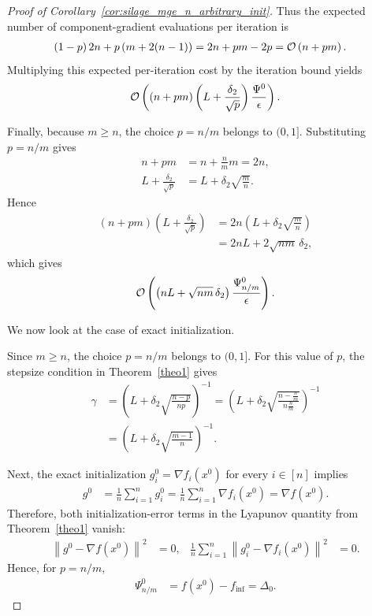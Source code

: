 \documentclass{article}
\newcommand{\sqn}[1]{\left\| #1 \right\|^2}
\newcommand{\nf}[1]{\nabla f\rb{#1}}
\newcommand{\cO}{{\cal O}}
\newcommand{\finf}{f_\mathrm{inf}}
\newcommand{\rb}[1]{\left(#1\right)}
\newcommand {\rbl}[1]{(#1)} %
\renewcommand{\nf}[1]{\nabla f\rbl{#1}}
\newcommand{\nfi}[1]{\nabla f_i\rbl{#1}}
\theoremstyle{plain}
\begin{document}
\begin{proof}[Proof of Corollary~\ref{cor:silage_mge_n_arbitrary_init}]
Thus the expected number of component-gradient evaluations per iteration is
\begin{align*}
(1-p)\,2n+p\rb{m+2(n-1)}
&=
2n+pm-2p
=
\cO\rb{n+pm}.
\end{align*}
Multiplying this expected per-iteration cost by the iteration bound yields
\begin{align*}
\cO\rb{
(n+pm)
\rb{L+\frac{\delta_2}{\sqrt p}}
\frac{\Psi^0}{\epsilon}
}.
\end{align*}

Finally, because $m\ge n$, the choice $p=n/m$ belongs to $(0,1]$. Substituting
$p=n/m$ gives
\begin{align*}
n+pm
&=
n+\frac{n}{m}m
=
2n,
\\
L+\frac{\delta_2}{\sqrt p}
&=
L+\delta_2\sqrt{\frac{m}{n}}.
\end{align*}
Hence
\begin{align*}
(n+pm)\rb{L+\frac{\delta_2}{\sqrt p}}
&=
2n\rb{L+\delta_2\sqrt{\frac{m}{n}}}
\\
&=
2nL+2\sqrt{nm}\,\delta_2,
\end{align*}
which gives
\begin{align*}
\cO\rb{
\rb{nL+\sqrt{nm}\,\delta_2}
\frac{\Psi_{n/m}^0}{\epsilon}
}.
\end{align*}

We now look at the case of exact initialization.



Since $m\ge n$, the choice $p=n/m$ belongs to $(0,1]$. For this value of $p$, the stepsize condition in Theorem~\ref{theo1} gives
\begin{align*}
\gamma
&=
\rb{
L+\delta_2\sqrt{\frac{n-p}{np}}
}^{-1}
=
\rb{
L+\delta_2\sqrt{
\frac{n-\frac{n}{m}}{n\frac{n}{m}}
}
}^{-1}
\\
&=
\rb{
L+\delta_2\sqrt{\frac{m-1}{n}}
}^{-1}.
\end{align*}

Next, the exact initialization $g_i^0=\nfi{x^0}$ for every $i\in[n]$ implies
\begin{align*}
g^0
&=
\frac1n\sum_{i=1}^n g_i^0
=
\frac1n\sum_{i=1}^n \nfi{x^0}
=
\nf{x^0}.
\end{align*}
Therefore, both initialization-error terms in the Lyapunov quantity from Theorem~\ref{theo1} vanish:
\begin{align*}
\sqn{g^0-\nf{x^0}}
&=0,
&
\frac1n\sum_{i=1}^n\sqn{g_i^0-\nfi{x^0}}
&=0.
\end{align*}
Hence, for $p=n/m$,
\begin{align*}
\Psi_{n/m}^0
&=
f(x^0)-\finf
=
\Delta_0.
\end{align*}


\end{proof}
\end{document}
